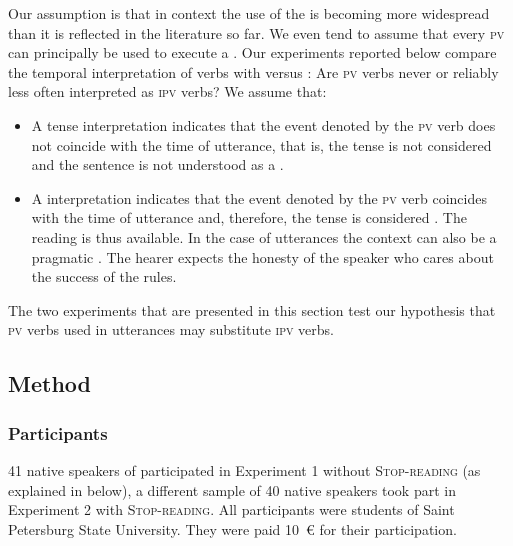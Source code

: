 \documentclass[output=paper,colorlinks,citecolor=brown,newtxmath,hidelinks]{langscibook}
\begin{document}
Our assumption is that in  context the use of the   is becoming more widespread than it is reflected in the literature so far. We even tend to assume that every \textsc{pv}  can principally be used to execute a . Our experiments reported below compare the temporal interpretation of  verbs with  versus : Are \textsc{pv}  verbs never or reliably less often interpreted as  \textsc{ipv}  verbs? We assume that:

\begin{itemize}
\item A  tense interpretation indicates that the event denoted by the \textsc{pv} verb does not coincide with the time of utterance, that is, the tense is not considered   and the sentence is not understood as a .
\item A  interpretation indicates that the event denoted by the \textsc{pv} verb coincides with the time of utterance and, therefore, the tense is considered  . The  reading is thus available. In the case of  utterances the context can also be a pragmatic . The hearer expects the honesty of the speaker who cares about the success of the rules.
\end{itemize}

The two experiments that are presented in this section test our hypothesis that \textsc{pv}  verbs used in  utterances may substitute \textsc{ipv} verbs. 

\subsection{Method}

\subsubsection{Participants}

41 native speakers of  participated in Experiment 1 without \textsc{Stop-reading} (as explained in  below), a different sample of 40  native speakers took part in Experiment 2 with \textsc{Stop-reading}. All participants were students of Saint Petersburg State University. They were paid 10~{\small\euro} for their participation.
\end{document}
